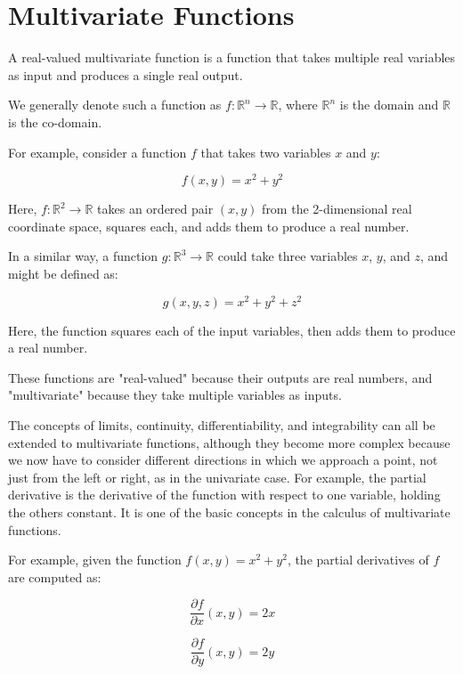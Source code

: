 \chapter{Multivariate Functions}

A real-valued multivariate function is a function that takes multiple
real variables as input and produces a single real output.

We generally denote such a function as $f: \mathbb{R}^n \rightarrow
\mathbb{R}$, where $\mathbb{R}^n$ is the domain and $\mathbb{R}$ is
the co-domain.

For example, consider a function $f$ that takes two variables $x$ and
$y$:

\begin{equation*}
f(x, y) = x^2 + y^2
\end{equation*}

Here, $f: \mathbb{R}^2 \rightarrow \mathbb{R}$ takes an ordered pair
$(x, y)$ from the 2-dimensional real coordinate space, squares each,
and adds them to produce a real number.

In a similar way, a function $g: \mathbb{R}^3 \rightarrow \mathbb{R}$
could take three variables $x$, $y$, and $z$, and might be defined as:

\begin{equation*}
g(x, y,z) = x^2 + y^2 + z^2
\end{equation*}

Here, the function squares each of the input variables, then adds
them to produce a real number.

These functions are "real-valued" because their outputs are real
numbers, and "multivariate" because they take multiple variables as
inputs.

The concepts of limits, continuity, differentiability, and
integrability can all be extended to multivariate functions, although
they become more complex because we now have to consider different
directions in which we approach a point, not just from the left or
right, as in the univariate case. For example, the partial derivative
is the derivative of the function with respect to one variable,
holding the others constant. It is one of the basic concepts in the
calculus of multivariate functions.

For example, given the function $f(x, y) = x^2 + y^2$, the partial
derivatives of $f$ are computed as:

\begin{equation*}
\frac{\partial f}{\partial x}(x, y) = 2x
\end{equation*}

\begin{equation*}
\frac{\partial f}{\partial y}(x, y) = 2y
\end{equation*}


